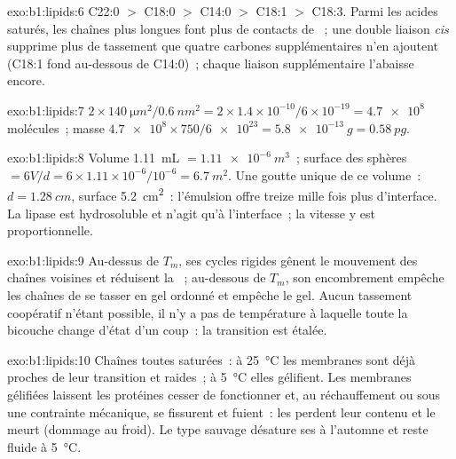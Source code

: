 \begin{solution}{exo:b1:lipids:6}
C22:0 $>$ C18:0 $>$ C14:0 $>$ C18:1 $>$ C18:3. Parmi les acides saturés,
les chaînes plus longues font plus de contacts de ~; une
double liaison \emph{cis} supprime plus de tassement que quatre carbones
supplémentaires n'en ajoutent (C18:1 fond au-dessous de C14:0)~; chaque
liaison supplémentaire l'abaisse encore.
\end{solution}

\begin{solution}{exo:b1:lipids:7}
$2\times\qty{140}{\micro m^2}/\qty{0.6}{nm^2} = 2\times 1.4\times
10^{-10}/6\times 10^{-19} = \num{4.7e8}$ molécules~; masse
$\num{4.7e8}\times 750/\num{6e23} = \qty{5.8e-13}{g} = \qty{0.58}{pg}$.
\end{solution}

\begin{solution}{exo:b1:lipids:8}
Volume \qty{1.11}{mL} $= \qty{1.11e-6}{m^3}$~; surface des sphères
$= 6V/d = 6\times 1.11\times 10^{-6}/10^{-6} = \qty{6.7}{m^2}$. Une
goutte unique de ce volume~: $d = \qty{1.28}{cm}$, surface
\qty{5.2}{cm^2}~: l'émulsion offre treize mille fois plus d'interface.
La lipase est hydrosoluble et n'agit qu'à l'interface~; la vitesse y est
proportionnelle.
\end{solution}

\begin{solution}{exo:b1:lipids:9}
Au-dessus de $T_m$, ses cycles rigides gênent le mouvement des chaînes
voisines et réduisent la ~; au-dessous de $T_m$, son
encombrement empêche les chaînes de se tasser en gel ordonné et empêche
le gel. Aucun tassement coopératif n'étant possible, il n'y a pas de
température à laquelle toute la bicouche change d'état d'un coup~: la
transition est étalée.
\end{solution}

\begin{solution}{exo:b1:lipids:10}
Chaînes toutes saturées~: à \qty{25}{\celsius} les membranes sont déjà
proches de leur transition et raides~; à \qty{5}{\celsius} elles
gélifient. Les membranes gélifiées laissent les protéines cesser de
fonctionner et, au réchauffement ou sous une contrainte mécanique, se
fissurent et fuient~: les  perdent leur contenu et le 
meurt (dommage au froid). Le type sauvage désature ses  à
l'automne et reste fluide à \qty{5}{\celsius}.
\end{solution}

